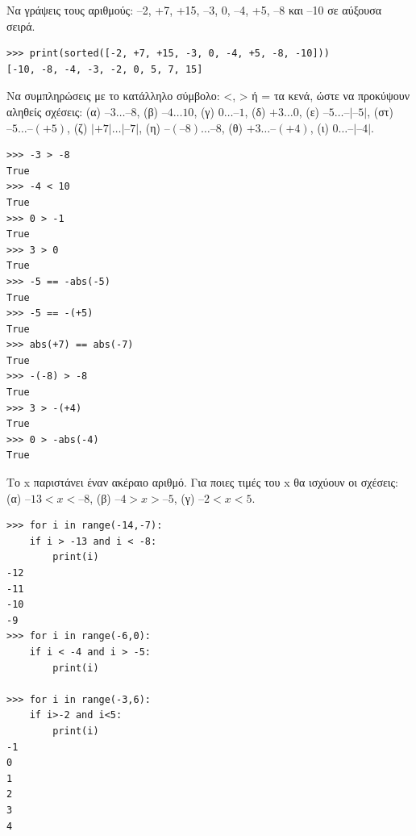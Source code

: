 \begin{exercise}
Να γράψεις τους αριθμούς: –2, +7, +15, –3, 0, –4, +5, –8 και –10 σε αύξουσα σειρά.
\end{exercise}
\begin{lstlisting}
>>> print(sorted([-2, +7, +15, -3, 0, -4, +5, -8, -10]))
[-10, -8, -4, -3, -2, 0, 5, 7, 15]
\end{lstlisting}
\begin{exercise}
Να συμπληρώσεις με το κατάλληλο σύμβολο: <, > ή = τα κενά, ώστε να προκύψουν
αληθείς σχέσεις: (α) $–3 \ldots –8$, (β) $–4 \ldots 10$, (γ) $0 \ldots –1$, (δ) $+3 \ldots 0$, (ε) $–5 \ldots –|–5|$,
(στ) $–5 \ldots –(+5)$, (ζ) $|+7| \ldots |–7|$, (η) $–(–8) \ldots –8$, (θ) $+3 \ldots –(+4)$, (ι) $0 \ldots –|–4|$.
\end{exercise}
\begin{lstlisting}
>>> -3 > -8
True
>>> -4 < 10
True
>>> 0 > -1
True
>>> 3 > 0
True
>>> -5 == -abs(-5)
True
>>> -5 == -(+5)
True
>>> abs(+7) == abs(-7)
True
>>> -(-8) > -8
True
>>> 3 > -(+4)
True
>>> 0 > -abs(-4)
True
\end{lstlisting}

\begin{exercise}
Το x παριστάνει έναν ακέραιο αριθμό. Για ποιες τιμές του x θα ισχύουν οι σχέσεις:
(α) $–13 < x < –8$, (β) $–4 > x > –5$, (γ) $–2 < x < 5$.
\end{exercise}
\begin{lstlisting}
>>> for i in range(-14,-7):
    if i > -13 and i < -8:
        print(i) 
-12
-11
-10
-9
>>> for i in range(-6,0):
    if i < -4 and i > -5:
        print(i) 

>>> for i in range(-3,6):
    if i>-2 and i<5:
        print(i)
-1
0
1
2
3
4
\end{lstlisting}
